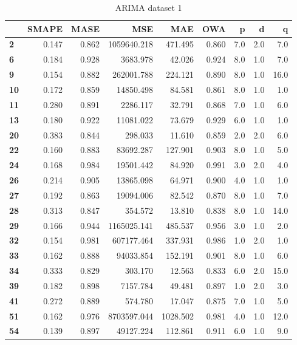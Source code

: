 \begin{table}[h]
\centering
\caption{ARIMA dataset 1}
\label{table:experiment_arima_dataset1}
\begin{tabular}{lrrrrrrrr}
\toprule
{} &  SMAPE &   MASE &          MSE &       MAE &    OWA &    p &    d &     q \\
\midrule
\textbf{2 } &  0.147 &  0.862 &  1059640.218 &   471.495 &  0.860 &  7.0 &  2.0 &   7.0 \\
\textbf{6 } &  0.184 &  0.928 &     3683.978 &    42.026 &  0.924 &  8.0 &  1.0 &   7.0 \\
\textbf{9 } &  0.154 &  0.882 &   262001.788 &   224.121 &  0.890 &  8.0 &  1.0 &  16.0 \\
\textbf{10} &  0.172 &  0.859 &    14850.498 &    84.581 &  0.861 &  8.0 &  1.0 &   1.0 \\
\textbf{11} &  0.280 &  0.891 &     2286.117 &    32.791 &  0.868 &  7.0 &  1.0 &   6.0 \\
\textbf{13} &  0.180 &  0.922 &    11081.022 &    73.679 &  0.929 &  6.0 &  1.0 &   1.0 \\
\textbf{20} &  0.383 &  0.844 &      298.033 &    11.610 &  0.859 &  2.0 &  2.0 &   6.0 \\
\textbf{22} &  0.160 &  0.883 &    83692.287 &   127.901 &  0.903 &  8.0 &  1.0 &   5.0 \\
\textbf{24} &  0.168 &  0.984 &    19501.442 &    84.920 &  0.991 &  3.0 &  2.0 &   4.0 \\
\textbf{26} &  0.214 &  0.905 &    13865.098 &    64.971 &  0.900 &  4.0 &  1.0 &   1.0 \\
\textbf{27} &  0.192 &  0.863 &    19094.006 &    82.542 &  0.870 &  8.0 &  1.0 &   7.0 \\
\textbf{28} &  0.313 &  0.847 &      354.572 &    13.810 &  0.838 &  8.0 &  1.0 &  14.0 \\
\textbf{29} &  0.166 &  0.944 &  1165025.141 &   485.537 &  0.956 &  3.0 &  1.0 &   2.0 \\
\textbf{32} &  0.154 &  0.981 &   607177.464 &   337.931 &  0.986 &  1.0 &  2.0 &   1.0 \\
\textbf{33} &  0.162 &  0.888 &    94033.854 &   152.191 &  0.901 &  8.0 &  1.0 &   6.0 \\
\textbf{34} &  0.333 &  0.829 &      303.170 &    12.563 &  0.833 &  6.0 &  2.0 &  15.0 \\
\textbf{39} &  0.182 &  0.898 &     7157.784 &    49.481 &  0.897 &  1.0 &  2.0 &   3.0 \\
\textbf{41} &  0.272 &  0.889 &      574.780 &    17.047 &  0.875 &  7.0 &  1.0 &   5.0 \\
\textbf{51} &  0.162 &  0.976 &  8703597.044 &  1028.502 &  0.981 &  4.0 &  1.0 &  12.0 \\
\textbf{54} &  0.139 &  0.897 &    49127.224 &   112.861 &  0.911 &  6.0 &  1.0 &   9.0 \\
\bottomrule
\end{tabular}
\end{table}
